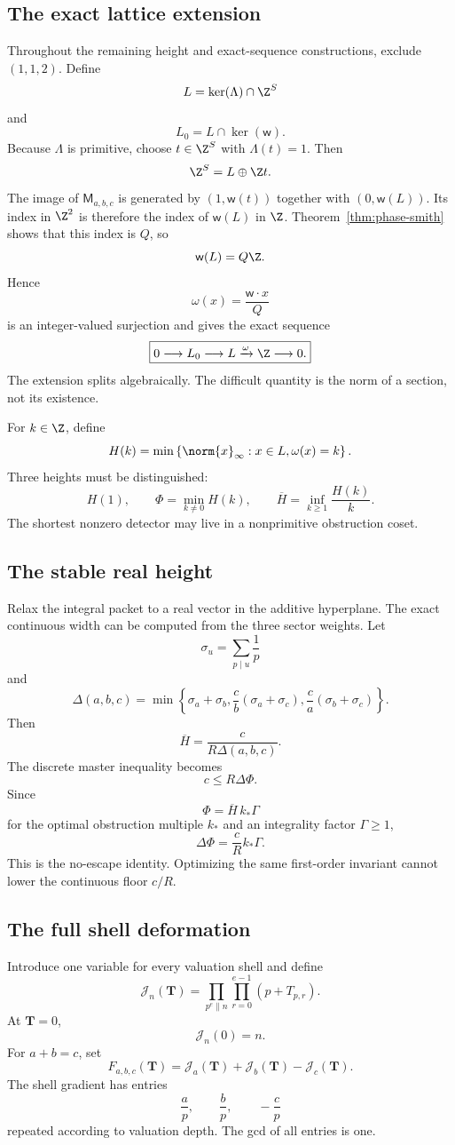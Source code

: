 \subsection{The exact lattice extension}
Throughout the remaining height and exact-sequence constructions, exclude $(1,1,2)$. Define
\[
 L=\ker(\Lambda)\cap\Z^S
\]
and
\[
 L_0=L\cap\ker(\mathsf w).
\]
Because $\Lambda$ is primitive, choose $t\in\Z^S$ with $\Lambda(t)=1$. Then
\[
 \Z^S=L\oplus\Z t.
\]
The image of $\mathsf M_{a,b,c}$ is generated by $(1,\mathsf w(t))$ together with $(0,\mathsf w(L))$. Its index in $\Z^2$ is therefore the index of $\mathsf w(L)$ in $\Z$. Theorem~\ref{thm:phase-smith} shows that this index is $Q$, so
\[
 \mathsf w(L)=Q\Z.
\]
Hence
\[
 \omega(x)=\frac{\mathsf w\cdot x}{Q}
\]
is an integer-valued surjection and gives the exact sequence
\[
 \boxed{
 0\longrightarrow L_0
 \longrightarrow L
 \xrightarrow{\omega}
 \Z
 \longrightarrow0.
 }
\]
The extension splits algebraically. The difficult quantity is the norm of a section, not its existence.

For $k\in\Z$, define
\[
 H(k)
 =
 \min\left\{
 \norm{x}_\infty:
 x\in L,
 \omega(x)=k
 \right\}.
\]
Three heights must be distinguished:
\[
 H(1),
 \qquad
 \Phi=\min_{k\neq0}H(k),
 \qquad
 \overline H=
 \inf_{k\ge1}\frac{H(k)}k.
\]
The shortest nonzero detector may live in a nonprimitive obstruction coset.

\subsection{The stable real height}
Relax the integral packet to a real vector in the additive hyperplane. The exact continuous width can be computed from the three sector weights. Let
\[
 \sigma_u=\sum_{p\mid u}\frac1p
\]
and
\[
 \Delta(a,b,c)
 =
 \min\left\{
 \sigma_a+\sigma_b,
 \frac cb(\sigma_a+\sigma_c),
 \frac ca(\sigma_b+\sigma_c)
 \right\}.
\]
Then
\[
 \boxed{
 \overline H
 =
 \frac{c}{R\Delta(a,b,c)}.
 }
\]
The discrete master inequality becomes
\[
 c\le R\Delta\Phi.
\]
Since
\[
 \Phi=\overline H\,k_*\Gamma
\]
for the optimal obstruction multiple $k_*$ and an integrality factor $\Gamma\ge1$,
\[
 \boxed{
 \Delta\Phi
 =
 \frac cR k_*\Gamma.
 }
\]
This is the no-escape identity. Optimizing the same first-order invariant cannot lower the continuous floor $c/R$.

\subsection{The full shell deformation}
Introduce one variable for every valuation shell and define
\[
 \mathscr J_n(\mathbf T)
 =
 \prod_{p^e\parallel n}
 \prod_{r=0}^{e-1}(p+T_{p,r}).
\]
At $\mathbf T=0$,
\[
 \mathscr J_n(0)=n.
\]
For $a+b=c$, set
\[
 F_{a,b,c}(\mathbf T)
 =
 \mathscr J_a(\mathbf T)
 +
 \mathscr J_b(\mathbf T)
 -
 \mathscr J_c(\mathbf T).
\]
The shell gradient has entries
\[
 \frac ap,
 \qquad
 \frac bp,
 \qquad
 -\frac cp
\]
repeated according to valuation depth. The gcd of all entries is one.

